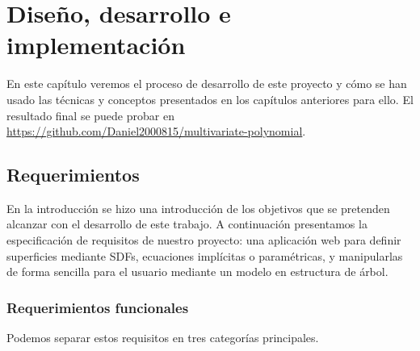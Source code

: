 \chapter{Diseño, desarrollo e implementación}\label{chapter3}
En este capítulo veremos el proceso de desarrollo de este proyecto y cómo se han usado las técnicas y conceptos presentados en los capítulos anteriores para ello. El resultado final se puede probar en \href{https://daniel2000815.github.io/SDF-Visualizer/}{https://github.com/Daniel2000815/multivariate-polynomial}.

\section{Requerimientos}
En la introducción se hizo una introducción de los objetivos que se pretenden alcanzar con el desarrollo de este trabajo. A continuación presentamos la especificación de requisitos de nuestro proyecto: una aplicación web para definir superficies mediante SDFs, ecuaciones implícitas o paramétricas, y manipularlas de forma sencilla para el usuario mediante un modelo en estructura de árbol.

\subsection{Requerimientos funcionales}
Podemos separar estos requisitos en tres categorías principales.

